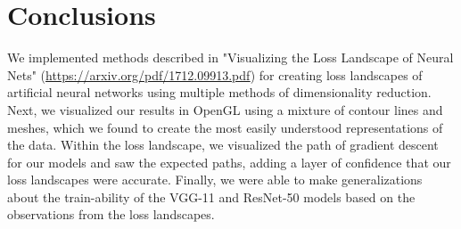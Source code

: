 \documentclass{acmsiggraph}
\begin{document}
\section{Conclusions}
We implemented methods described in "Visualizing the Loss Landscape of Neural Nets" (\url{https://arxiv.org/pdf/1712.09913.pdf}) for creating loss landscapes of artificial neural networks using multiple methods of dimensionality reduction. Next, we visualized our results in OpenGL using a mixture of contour lines and meshes, which we found to create the most easily understood representations of the data. Within the loss landscape, we visualized the path of gradient descent for our models and saw the expected paths, adding a layer of confidence that our loss landscapes were accurate. Finally, we were able to make generalizations about the train-ability of the VGG-11 and ResNet-50 models based on the observations from the loss landscapes.


\nocite{*}

\end{document}
